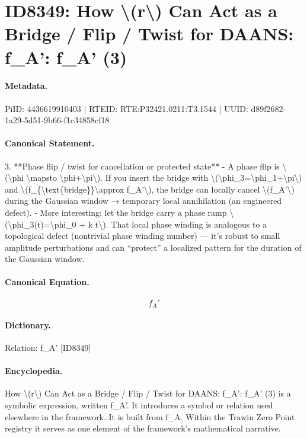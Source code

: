 \section*{ID8349: How \textbackslash{}(r\textbackslash{}) Can Act as a Bridge / Flip / Twist for DAANS: f\_A': f\_A' (3)}
\paragraph{Metadata.}
PiID: 4436619910403 | RTEID: RTE:P32421.0211:T3.1544 | UUID: d89f2682-1a29-5d51-9b66-f1c34858cf18

\paragraph{Canonical Statement.}
3. **Phase flip / twist for cancellation or protected state** - A phase flip is \textbackslash{}(\textbackslash{}phi \textbackslash{}mapsto \textbackslash{}phi+\textbackslash{}pi\textbackslash{}). If you insert the bridge with \textbackslash{}(\textbackslash{}phi\_3=\textbackslash{}phi\_1+\textbackslash{}pi\textbackslash{}) and \textbackslash{}(f\_\{\textbackslash{}text\{bridge\}\}\textbackslash{}approx f\_A'\textbackslash{}), the bridge can locally cancel \textbackslash{}(f\_A'\textbackslash{}) during the Gaussian window → temporary local annihilation (an engineered defect). - More interesting: let the bridge carry a phase ramp \textbackslash{}(\textbackslash{}phi\_3(t)=\textbackslash{}phi\_0 + k t\textbackslash{}). That local phase winding is analogous to a topological defect (nontrivial phase winding number) — it’s robust to small amplitude perturbations and can “protect” a localized pattern for the duration of the Gaussian window.

\paragraph{Canonical Equation.}
\[
f_A'
\]

\paragraph{Dictionary.}
Relation: f\_A' [ID8349]

\paragraph{Encyclopedia.}
How \textbackslash{}(r\textbackslash{}) Can Act as a Bridge / Flip / Twist for DAANS: f\_A': f\_A' (3) is a symbolic expression, written f\_A'. It introduces a symbol or relation used elsewhere in the framework. It is built from f\_A. Within the Trawin Zero Point registry it serves as one element of the framework's mathematical narrative.
